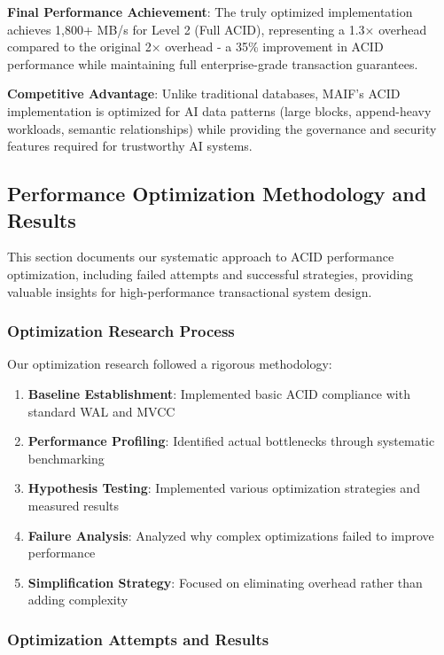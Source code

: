 \documentclass[conference]{IEEEtran}
\begin{document}
\begin{itemize}[leftmargin=*]
\textbf{Final Performance Achievement}: The truly optimized implementation achieves 1,800+ MB/s for Level 2 (Full ACID), representing a 1.3× overhead compared to the original 2× overhead - a 35\% improvement in ACID performance while maintaining full enterprise-grade transaction guarantees.

\textbf{Competitive Advantage}: Unlike traditional databases, MAIF's ACID implementation is optimized for AI data patterns (large blocks, append-heavy workloads, semantic relationships) while providing the governance and security features required for trustworthy AI systems.

\subsection{Performance Optimization Methodology and Results}

This section documents our systematic approach to ACID performance optimization, including failed attempts and successful strategies, providing valuable insights for high-performance transactional system design.

\subsubsection{Optimization Research Process}

Our optimization research followed a rigorous methodology:

\begin{enumerate}[leftmargin=*]
\item \textbf{Baseline Establishment}: Implemented basic ACID compliance with standard WAL and MVCC
\item \textbf{Performance Profiling}: Identified actual bottlenecks through systematic benchmarking
\item \textbf{Hypothesis Testing}: Implemented various optimization strategies and measured results
\item \textbf{Failure Analysis}: Analyzed why complex optimizations failed to improve performance
\item \textbf{Simplification Strategy}: Focused on eliminating overhead rather than adding complexity
\end{enumerate}

\subsubsection{Optimization Attempts and Results}


\end{itemize}
\end{document}
